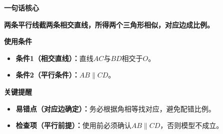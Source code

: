 \begin{summarybox}
	\textbf{\textcolor{CSummary}{一句话核心}}
	\par\textbf{两条平行线截两条相交直线，所得两个三角形相似，对应边成比例。}

	\medskip
	\textbf{\textcolor{CSummary}{使用条件}}
	\begin{itemize}[leftmargin=*, itemsep=0.5em, topsep=0.4em]
		\item \textbf{条件1（相交直线）：}直线$AC$与$BD$相交于$O$。
		\item \textbf{条件2（平行条件）：}$AB\parallel CD$。
	\end{itemize}

	\medskip
	\textbf{\textcolor{CSummary}{关键提醒}}
	\begin{itemize}[leftmargin=*, itemsep=0.5em, topsep=0.4em]
		\item \textbf{易错点（对应边确定）：}务必根据角相等找对应，避免配错比例。
		\item \textbf{检查项（平行前提）：}使用前必须确认$AB\parallel CD$，否则模型不成立。
	\end{itemize}

\end{summarybox}
